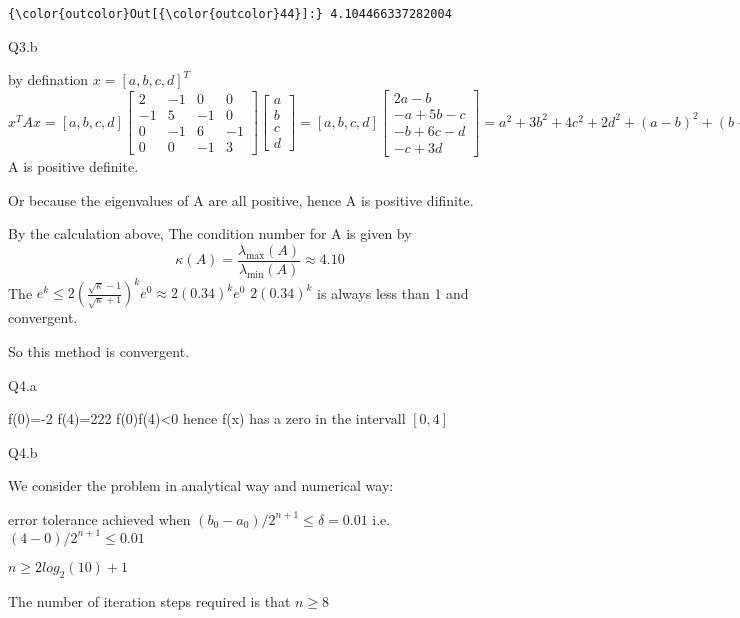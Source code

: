 \documentclass[11pt]{article}
\begin{document}
\begin{Verbatim}[commandchars=\\\{\}]
{\color{outcolor}Out[{\color{outcolor}44}]:} 4.104466337282004
\end{Verbatim}
            
    Q3.b

by defination \(x=[a, b, c, d]^T\)
\[x^TAx=[a,b,c,d]\left[\begin{array}{cccc}
2 & -1 & 0 & 0\\
-1 & 5 & -1  & 0\\
0 & -1 & 6 & -1 \\
0 & 0 & -1 & 3
\end{array}\right]
\left[\begin{array}{c}
a \\
b\\
c\\
d
\end{array}\right]
=[a,b,c,d]\left[\begin{array}{c}
2a-b \\
-a+5b-c\\
-b+6c-d\\
-c+3d
\end{array}\right]
=a^2+3b^2+4c^2+2d^2+(a-b)^2+(b-c)^2+(c-d)^2>0
if x\neq 0\] A is positive definite.

Or because the eigenvalues of A are all positive, hence A is positive
difinite.

By the calculation above, The condition number for A is given by
\[\kappa(A) = \frac{\lambda_{\max}(A)}{\lambda_{\min}(A)}\approx4.10\]
The
\(e^k\leq 2(\frac{\sqrt\kappa-1}{\sqrt\kappa+1})^k e^0\approx 2(0.34)^k e^0\)
\(2(0.34)^k\) is always less than 1 and convergent.

So this method is convergent.

    Q4.a

f(0)=-2 f(4)=222 f(0)f(4)\textless{}0 hence f(x) has a zero in the
intervall \([0, 4]\)

    Q4.b

We consider the problem in analytical way and numerical way:

error tolerance achieved when \((b_0-a_0)/2^{n+1}\leq \delta=0.01\) i.e.
\((4-0)/2^{n+1}\leq 0.01\)

\(n\geq2log_2(10)+1\)

The number of iteration steps required is that \(n\geq 8\)
\end{document}
